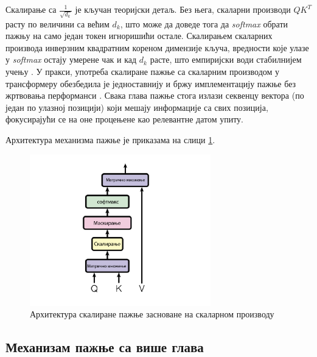 Скалирање са $\frac{1}{\sqrt{d_k}}$ је кључан теоријски детаљ. Без њега, скаларни производи $QK^T$ расту по величини са већим $d_k$, што може да доведе тога да \textit{softmax} обрати пажњу на само један токен игноришићи остале. Скалирањем скаларних производа инверзним квадратним кореном димензије кључа, вредности које улазе у \textit{softmax} остају умерене чак и кад $d_k$ расте, што емпиријски води стабилнијем учењу \cite{vaswani_attention_2017,bahdanau_neural_2015}. У пракси, употреба скалиране пажње са скаларним производом у трансформеру обезбедила је једноставнију и бржу имплементацију пажње без жртвовања перформанси \cite{vaswani_attention_2017}. Свака глава пажње стога излази секвенцу вектора (по један по улазној позицији) који мешају информације са свих позиција, фокусирајући се на оне процењене као релевантне датом упиту.
\newline

Архитектура механизма пажње је приказама на слици \ref{fig:dot_attention}.

\begin{figure}[h]
    \centering
    \includegraphics[width=0.7\textwidth]{images/dot-attention.png}
    \caption{Архитектура скалиране пажње засноване на скаларном производу}
    \label{fig:dot_attention}
\end{figure}

\subsection{Механизам пажње са више глава}

